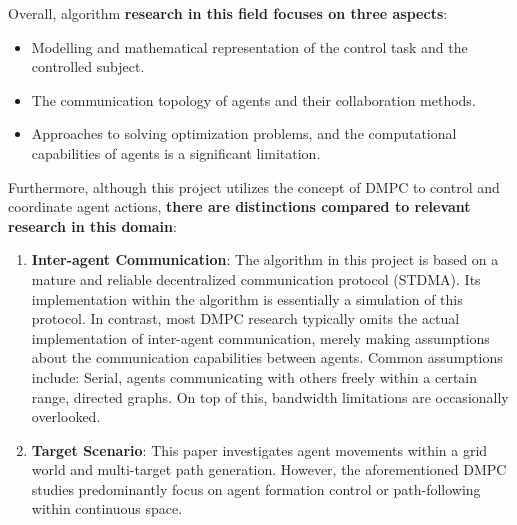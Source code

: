 Overall, algorithm \textbf{research in this field focuses on three aspects}:
\begin{itemize}
  \item 
  Modelling and mathematical representation of the control task and the controlled subject.
  \item 
  The communication topology of agents and their collaboration methods.
  \item 
  Approaches to solving optimization problems, and the computational capabilities of agents is a significant limitation.
\end{itemize}

Furthermore, although this project utilizes the concept of DMPC to control and coordinate agent actions, \textbf{there are distinctions compared to relevant research in this domain}:
\begin{enumerate}
  \item 
  \textbf{Inter-agent Communication}: The algorithm in this project is based on a mature and reliable decentralized communication protocol (STDMA). Its implementation within the algorithm is essentially a simulation of this protocol. 
  In contrast, most DMPC research typically omits the actual implementation of inter-agent communication, merely making assumptions about the communication capabilities between agents. 
  Common assumptions include: Serial\cite{xin2023model}, agents communicating with others freely within a certain range\cite{mousavi2020distributed,yang2022cooperative,zheng2023distributed,zhao2022distributed}, directed graphs\cite{tang2022distributed,zang2022optimal}. On top of this, bandwidth limitations are occasionally overlooked\cite{zheng2023distributed}.
  \item 
  \textbf{Target Scenario}: This paper investigates agent movements within a grid world\cite{GridWorld} and multi-target path generation. However, the aforementioned DMPC studies predominantly focus on agent formation control or path-following within continuous space.
\end{enumerate}

